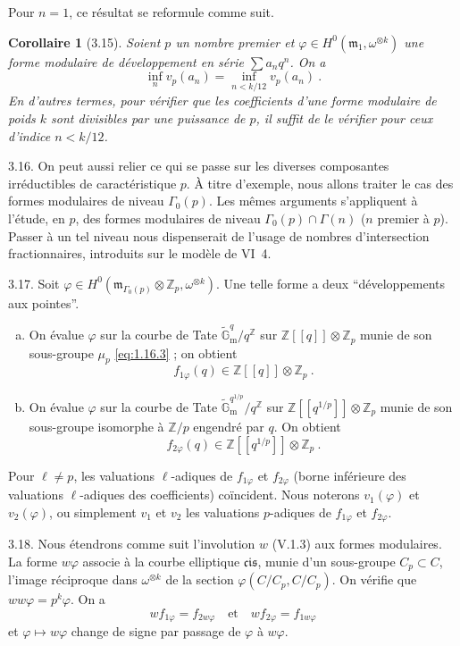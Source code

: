 \documentclass[12pt,a4paper]{amsart}
\theoremstyle{plain}
\newtheorem{corollaire}[proposition]{Corollaire}
\theoremstyle{definition}
\theoremstyle{remark}
\newcommand{\ZZ}{\mathbb{Z}}
\newcommand{\Gmtilde}{\widetilde{\mathbb{G}}_\mathrm{m}}
\begin{document}
Pour $n = 1$, ce r\'esultat se reformule comme suit.

\begin{corollaire}[3.15]
Soient $p$ un nombre premier et $\varphi \in H^0(\mathfrak{m}_1, \omega^{\otimes k})$ une forme modulaire de d\'eveloppement en s\'erie $\sum a_n q^n$. On a
\[
\inf_n v_p(a_n) = \inf_{n < k/12} v_p(a_n) \ .
\]
En d'autres termes, pour v\'erifier que les coefficients d'une forme modulaire de poids $k$ sont divisibles par une puissance de $p$, il suffit de le v\'erifier pour ceux d'indice $n < k/12$.
\end{corollaire}

3.16. On peut aussi relier ce qui se passe sur les diverses composantes irr\'eductibles de caract\'eristique $p$. \`A titre d'exemple, nous allons traiter le cas des formes modulaires de niveau $\Gamma_0(p)$. Les m\^emes arguments s'appliquent \`a l'\'etude, en $p$, des formes modulaires de niveau $\Gamma_0(p) \cap \Gamma(n)$ ($n$ premier \`a $p$). Passer \`a un tel niveau nous dispenserait de l'usage de nombres d'intersection fractionnaires, introduits sur le mod\`ele de VI~4.

3.17. Soit $\varphi \in H^0(\mathfrak{m}_{\Gamma_0(p)} \otimes \ZZ_p, \omega^{\otimes k})$. Une telle forme a deux ``d\'eveloppements aux pointes''.
\begin{enumerate}[a)]
\item On \'evalue $\varphi$ sur la courbe de Tate $\Gmtilde^q / q^{\ZZ}$ sur $\ZZ[[q]] \otimes \ZZ_p$ munie de son sous-groupe $\mu_p$ \eqref{eq:1.16.3} ; on obtient
\[
f_{1\varphi}(q) \in \ZZ[[q]] \otimes \ZZ_p \ .
\]

\item On \'evalue $\varphi$ sur la courbe de Tate $\Gmtilde^{q^{1/p}} / q^{\ZZ}$ sur $\ZZ[[q^{1/p}]] \otimes \ZZ_p$ munie de son sous-groupe isomorphe \`a $\ZZ/p$ engendr\'e par $q$. On obtient
\[
f_{2\varphi}(q) \in \ZZ[[q^{1/p}]] \otimes \ZZ_p \ .
\]
\end{enumerate}

Pour $\ell \neq p$, les valuations $\ell$-adiques de $f_{1\varphi}$ et $f_{2\varphi}$ (borne inf\'erieure des valuations $\ell$-adiques des coefficients) co\"incident. Nous noterons $v_1(\varphi)$ et $v_2(\varphi)$, ou simplement $v_1$ et $v_2$ les valuations $p$-adiques de $f_{1\varphi}$ et $f_{2\varphi}$.

3.18. Nous \'etendrons comme suit l'involution $w$ (V.1.3) aux formes modulaires. La forme $w\varphi$ associe \`a la courbe elliptique $\mathfrak{cis}$, munie d'un sous-groupe $C_p \subset C$, l'image r\'eciproque dans $\omega^{\otimes k}$ de la section $\varphi(C/C_p, C/C_p)$. On v\'erifie que $ww\varphi = p^k \varphi$. On a
\[
w f_{1\varphi} = f_{2w\varphi} \quad \text{et} \quad w f_{2\varphi} = f_{1w\varphi}
\]
et $\varphi \mapsto w\varphi$ change de signe par passage de $\varphi$ \`a $w\varphi$.
\end{document}
